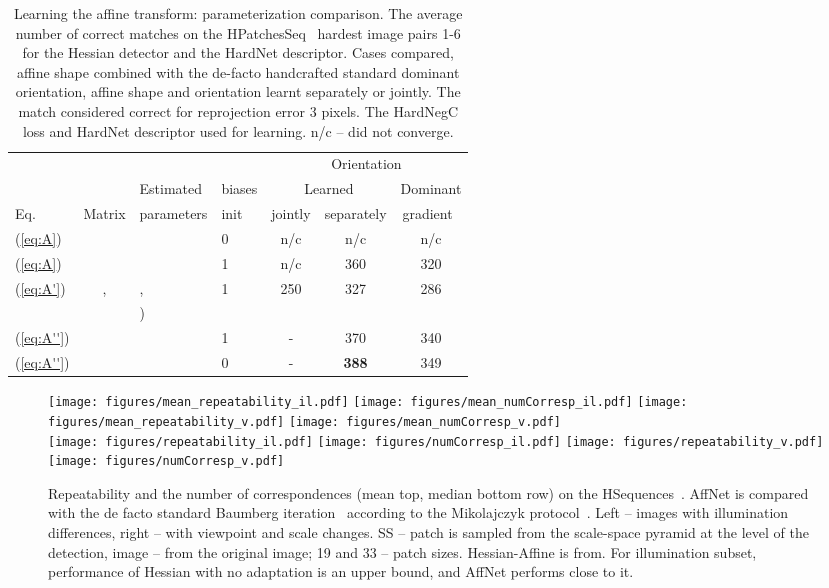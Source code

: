 \documentclass[runningheads]{llncs}
\begin{document}
\begin{table}[htb]\centering
\caption{Learning the affine transform: parameterization comparison. The average number of correct matches on the HPatchesSeq~\cite{hpatches2017} hardest image pairs 1-6 for the Hessian detector and the HardNet descriptor.
Cases compared, affine shape combined with the de-facto handcrafted standard dominant orientation, affine shape and orientation learnt separately or jointly. The match considered correct for reprojection error  3 pixels. The HardNegC loss and HardNet descriptor used for learning. n/c -- did not converge.}
\label{tab:aff-shape-parametrization}
\setlength{\tabcolsep}{2mm}
\begin{tabular}{lcllccc}
\toprule
&&&& \multicolumn{3}{c}{Orientation} \\
\cmidrule(r){5-7}
& & Estimated& biases & \multicolumn{2}{c}{Learned} & Dominant \\ 
\cmidrule(r){5-6}
Eq. &Matrix& parameters &  init & jointly & separately & gradient~\cite{SIFT2004} \\ 
\cmidrule(r){1-7}
(\ref{eq:A})& &  & 0 & n/c & n/c  & n/c \\
(\ref{eq:A})&  &  & 1 & n/c & 360  & 320 \\
\cmidrule(r){1-7}
(\ref{eq:A'}) &,& , & 1 & 250 & 327  & 286 \\
&    & ) & & & \\
\cmidrule(r){1-7}
(\ref{eq:A''})&  & &  1 & - &  370 & 340  \\
(\ref{eq:A''})& & &  0 & - &  \textbf{388} & 349  \\
\bottomrule
\end{tabular}
\end{table}
\begin{figure}[htb]
\centering
 \texttt{[image: figures/mean\_repeatability\_il.pdf]}
 \texttt{[image: figures/mean\_numCorresp\_il.pdf]}
 \texttt{[image: figures/mean\_repeatability\_v.pdf]}
 \texttt{[image: figures/mean\_numCorresp\_v.pdf]}\\
 \texttt{[image: figures/repeatability\_il.pdf]}
 \texttt{[image: figures/numCorresp\_il.pdf]}
 \texttt{[image: figures/repeatability\_v.pdf]}
 \texttt{[image: figures/numCorresp\_v.pdf]}\\
 \caption{Repeatability and the number of correspondences (mean top, median bottom row) on the HSequences~\cite{hpatches2017}. AffNet is compared with the de facto standard Baumberg iteration~\cite{Baumberg2000} according to the Mikolajczyk protocol~\cite{Mikolajczyk2005}. Left -- images with illumination differences, right -- with viewpoint and scale changes. SS -- patch is sampled from the scale-space pyramid at the level of the detection, image -- from the original image; 19 and 33 -- patch sizes. Hessian-Affine is from\cite{Perdoch-CVPR2009efficient}. For illumination subset, performance of Hessian with no adaptation is an upper bound, and AffNet performs close to it.}
 \label{fig:repeatability}
\end{figure}
\end{document}
